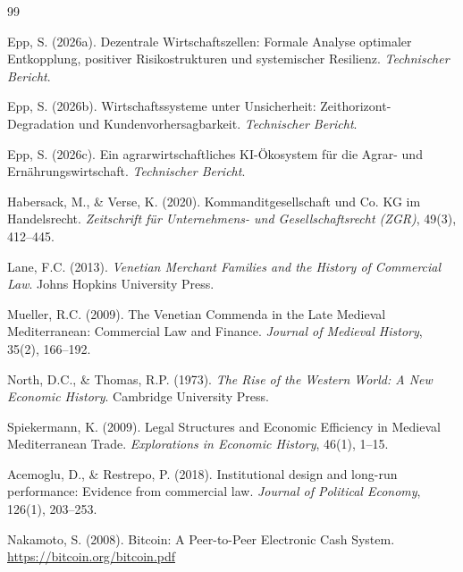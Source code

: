 \documentclass[a4paper,12pt]{article}
\theoremstyle{definition}
\begin{document}
\begin{thebibliography}{99}

Epp, S. (2026a).
\newblock Dezentrale Wirtschaftszellen: Formale Analyse optimaler Entkopplung,
          positiver Risikostrukturen und systemischer Resilienz.
\newblock \emph{Technischer Bericht}.

Epp, S. (2026b).
\newblock Wirtschaftssysteme unter Unsicherheit: Zeithorizont-Degradation
          und Kundenvorhersagbarkeit.
\newblock \emph{Technischer Bericht}.

Epp, S. (2026c).
\newblock Ein agrarwirtschaftliches KI-Ökosystem für die Agrar- und Ernährungswirtschaft.
\newblock \emph{Technischer Bericht}.

Habersack, M., \& Verse, K. (2020).
\newblock Kommanditgesellschaft und Co. KG im Handelsrecht.
\newblock \emph{Zeitschrift für Unternehmens- und Gesellschaftsrecht (ZGR)}, 49(3), 412--445.

Lane, F.C. (2013).
\newblock \emph{Venetian Merchant Families and the History of Commercial Law}.
\newblock Johns Hopkins University Press.

Mueller, R.C. (2009).
\newblock The Venetian Commenda in the Late Medieval Mediterranean: Commercial Law and Finance.
\newblock \emph{Journal of Medieval History}, 35(2), 166--192.

North, D.C., \& Thomas, R.P. (1973).
\newblock \emph{The Rise of the Western World: A New Economic History}.
\newblock Cambridge University Press.

Spiekermann, K. (2009).
\newblock Legal Structures and Economic Efficiency in Medieval Mediterranean Trade.
\newblock \emph{Explorations in Economic History}, 46(1), 1--15.

Acemoglu, D., \& Restrepo, P. (2018).
\newblock Institutional design and long-run performance: Evidence from commercial law.
\newblock \emph{Journal of Political Economy}, 126(1), 203--253.

Nakamoto, S. (2008).
\newblock Bitcoin: A Peer-to-Peer Electronic Cash System.
\newblock \url{https://bitcoin.org/bitcoin.pdf}


\end{thebibliography}
\end{document}
